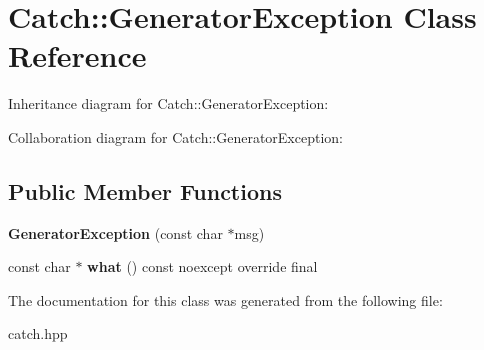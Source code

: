 \hypertarget{classCatch_1_1GeneratorException}{}\section{Catch\+:\+:Generator\+Exception Class Reference}
\label{classCatch_1_1GeneratorException}


Inheritance diagram for Catch\+:\+:Generator\+Exception\+:


Collaboration diagram for Catch\+:\+:Generator\+Exception\+:
\subsection*{Public Member Functions}
\begin{DoxyCompactItemize}
\item 
\mbox{\label{classCatch_1_1GeneratorException_a3cf9282d555ec32389665ce723bf36ea}} 
{\bfseries Generator\+Exception} (const char $\ast$msg)
\item 
\mbox{\label{classCatch_1_1GeneratorException_ade029163144d136f12187e5b9a0161d5}} 
const char $\ast$ {\bfseries what} () const noexcept override final
\end{DoxyCompactItemize}


The documentation for this class was generated from the following file\+:\begin{DoxyCompactItemize}
\item 
catch.\+hpp\end{DoxyCompactItemize}
